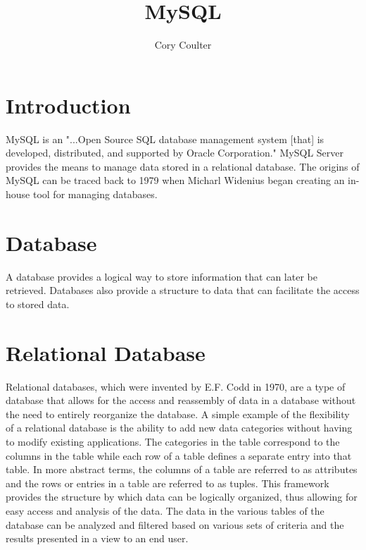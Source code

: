 \documentclass[9pt,twocolumn,twoside]{../../styles/osajnl}
\title{MySQL}
\author[1,*, +]{Cory Coulter}
\affil[1]{School of Informatics and Computing, Bloomington, IN 47408, U.S.A.}
\affil[*]{Corresponding Authors: cacoulte11@gmail.com}
\affil[+]{HID - S17-IO-3004}
\begin{document}
\maketitle

\section{Introduction}
MySQL is an "...Open Source SQL database management system [that] is
developed, distributed, and supported by Oracle Corporation."
\cite{devmysql} MySQL Server provides the means to manage data stored
in a relational database. \cite{devmysql} The origins of MySQL can be
traced back to 1979 when Micharl Widenius began creating an in-house
tool for managing databases. \cite{mik}

\section{Database}
A database provides a logical way to store information that can later
be retrieved. \cite{mysqlbible} Databases also provide a structure to
data that can facilitate the access to stored data.

\section{Relational Database}
Relational databases, which were invented by E.F. Codd in 1970, are a
type of database that allows for the access and reassembly of data in
a database without the need to entirely reorganize the
database. \cite{searchsql} A simple example of the flexibility of a
relational database is the ability to add new data categories without
having to modify existing applications. \cite{searchsql} The
categories in the table correspond to the columns in the table while
each row of a table defines a separate entry into that
table. \cite{ibm} In more abstract terms, the columns of a table are
referred to as attributes and the rows or entries in a table are
referred to as tuples. This framework provides the structure by which
data can be logically organized, thus allowing for easy access and
analysis of the data. The data in the various tables of the database
can be analyzed and filtered based on various sets of criteria and the
results presented in a view to an end user. \cite{searchsql}
\end{document}
